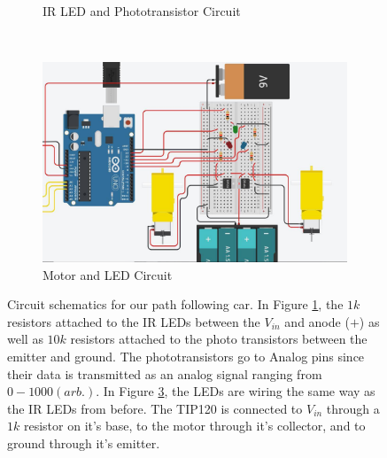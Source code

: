 \documentclass[twocolumn]{article}
\begin{document}
\begin{flushleft}
\begin{figure}[!h]
			{\begin{subfigure}[b]{0.45\textwidth}
				\caption{IR LED and Phototransistor Circuit}
				\label{fig:circuitSensors}
			\end{subfigure}\\ \vspace{1em}%
			\begin{subfigure}[b]{0.45\textwidth}
				\includegraphics[width=1\columnwidth, keepaspectratio]{CircuitMotors.jpg}
				\caption{Motor and LED Circuit}
				\label{fig:circuitMotors}
			\end{subfigure}
			
			\caption{Circuit schematics for our path following car. In Figure \ref{fig:circuitSensors}, the $1k$ resistors attached to the IR LEDs between the $V_{in}$ and anode ($+$) as well as $10k$ resistors attached to the photo transistors between the emitter and ground. The phototransistors go to Analog pins since their data is transmitted as an analog signal ranging from $0-1000 (arb.)$. In Figure \ref{fig:circuitMotors}, the LEDs are wiring the same way as the IR LEDs from before. The TIP120 is connected to $V_{in}$ through a $1k$ resistor on it's base, to the motor through it's collector, and to ground through it's emitter.}
}
		\end{figure}
		

\end{flushleft}
\end{document}
